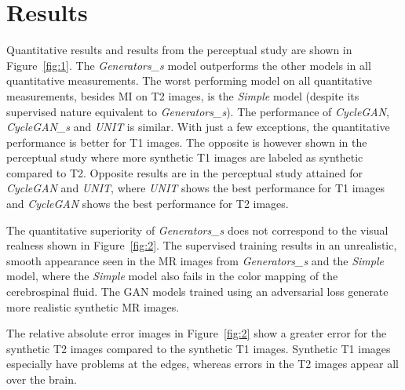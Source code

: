 \documentclass{article}
\begin{document}
\section{Results}
Quantitative results and results from the perceptual study are shown in Figure~\ref{fig:1}. The \emph{Generators\_s} model outperforms the other models in all quantitative measurements. The worst performing model on all quantitative measurements, besides MI on T2 images, is the \emph{Simple} model (despite its supervised nature equivalent to \emph{Generators\_s}). The performance of \emph{CycleGAN}, \emph{CycleGAN\_s} and \emph{UNIT} is similar. With just a few exceptions, the quantitative performance is better for T1 images. The opposite is however shown in the perceptual study where more synthetic T1 images are labeled as synthetic compared to T2. Opposite results are in the perceptual study attained for \emph{CycleGAN} and \emph{UNIT}, where \emph{UNIT} shows the best performance for T1 images and \emph{CycleGAN} shows the best performance for T2 images.

The quantitative superiority of \emph{Generators\_s} does not correspond to the visual realness shown in Figure~\ref{fig:2}. The supervised training results in an unrealistic, smooth appearance seen in the MR images from \emph{Generators\_s} and the \emph{Simple} model, where the \emph{Simple} model also fails in the color mapping of the cerebrospinal fluid. The GAN models trained using an adversarial loss generate more realistic synthetic MR images.

The relative absolute error images in Figure~\ref{fig:2} show a greater error for the synthetic T2 images compared to the synthetic T1 images. Synthetic T1 images especially have problems at the edges, whereas errors in the T2 images appear all over the brain.
\end{document}
